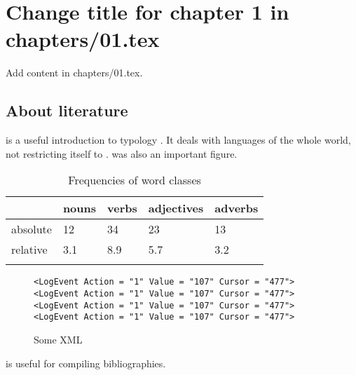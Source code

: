 \chapter{Change title for chapter 1 in chapters/01.tex}
Add content in chapters/01.tex.

\section{About literature}
\citet{Comrie1981} is a useful introduction to typology . %
It deals with languages of the whole world, not restricting itself to . %
 was also an important figure. %

\begin{table}
\caption{Frequencies of word classes}
\label{tab:1:frequencies}
 \begin{tabular}{lllll} %
  \lsptoprule
            & nouns & verbs & adjectives & adverbs\\ %
  \midrule
  absolute  &   12 &    34  &    23     & 13\\
  relative  &   3.1 &   8.9 &    5.7    & 3.2\\
  \lspbottomrule
 \end{tabular}
\end{table}

\begin{figure}
\caption{Some XML}
\begin{lstlisting}
<LogEvent Action = "1" Value = "107" Cursor = "477">
<LogEvent Action = "1" Value = "107" Cursor = "477">
<LogEvent Action = "1" Value = "107" Cursor = "477">
<LogEvent Action = "1" Value = "107" Cursor = "477">
\end{lstlisting}
\end{figure}


 
\citet{Nordhoff2018} is useful for compiling bibliographies.
\citet{aikhenvald2000classifiers,alexiadou2011plural,abbott1996doing,acquaviva2008lexical}